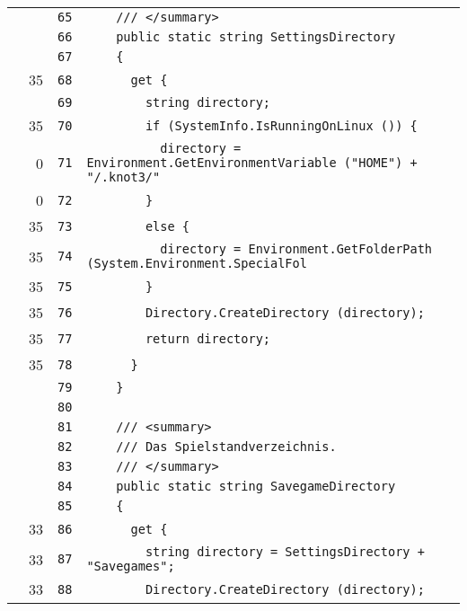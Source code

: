 \documentclass[a4paper,10pt]{article}
\begin{document}
\begin{longtable}[l]{lrrl}
\cellcolor{gray} &  & \verb~65~ & \verb~    /// </summary>~\\
\cellcolor{gray} &  & \verb~66~ & \verb~    public static string SettingsDirectory~\\
\cellcolor{gray} &  & \verb~67~ & \verb~    {~\\
\cellcolor{green} & 35 & \verb~68~ & \verb~      get {~\\
\cellcolor{gray} &  & \verb~69~ & \verb~        string directory;~\\
\cellcolor{green} & 35 & \verb~70~ & \verb~        if (SystemInfo.IsRunningOnLinux ()) {~\\
\cellcolor{red} & 0 & \verb~71~ & \verb~          directory = Environment.GetEnvironmentVariable ("HOME") + "/.knot3/"~\\
\cellcolor{red} & 0 & \verb~72~ & \verb~        }~\\
\cellcolor{green} & 35 & \verb~73~ & \verb~        else {~\\
\cellcolor{green} & 35 & \verb~74~ & \verb~          directory = Environment.GetFolderPath (System.Environment.SpecialFol~\\
\cellcolor{green} & 35 & \verb~75~ & \verb~        }~\\
\cellcolor{green} & 35 & \verb~76~ & \verb~        Directory.CreateDirectory (directory);~\\
\cellcolor{green} & 35 & \verb~77~ & \verb~        return directory;~\\
\cellcolor{green} & 35 & \verb~78~ & \verb~      }~\\
\cellcolor{gray} &  & \verb~79~ & \verb~    }~\\
\cellcolor{gray} &  & \verb~80~ & \verb~~\\
\cellcolor{gray} &  & \verb~81~ & \verb~    /// <summary>~\\
\cellcolor{gray} &  & \verb~82~ & \verb~    /// Das Spielstandverzeichnis.~\\
\cellcolor{gray} &  & \verb~83~ & \verb~    /// </summary>~\\
\cellcolor{gray} &  & \verb~84~ & \verb~    public static string SavegameDirectory~\\
\cellcolor{gray} &  & \verb~85~ & \verb~    {~\\
\cellcolor{green} & 33 & \verb~86~ & \verb~      get {~\\
\cellcolor{green} & 33 & \verb~87~ & \verb~        string directory = SettingsDirectory + "Savegames";~\\
\cellcolor{green} & 33 & \verb~88~ & \verb~        Directory.CreateDirectory (directory);~\\

\end{longtable}
\end{document}

